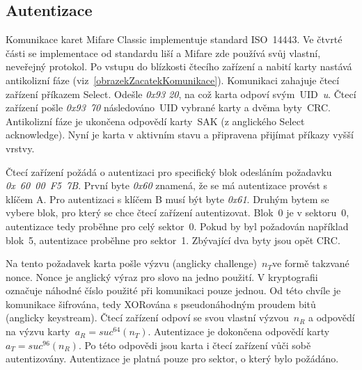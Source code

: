 \subsection{Autentizace}
\label{autentizace}
Komunikace karet Mifare Classic implementuje standard ISO~14443. Ve čtvrté části se implementace od standardu liší a Mifare zde používá svůj vlastní, neveřejný protokol. Po vstupu do blízkosti čtecího zařízení a nabití karty nastává antikolizní fáze (viz~\ref{obrazekZacatekKomunikace}). Komunikaci zahajuje čtecí zařízení příkazem Select. Odešle \emph{0x93 20}, na což karta odpoví svým~UID~\emph{u}. Čtecí zařízení pošle \emph{0x93~70} následováno~UID vybrané karty a dvěma byty~CRC. Antikolizní fáze je ukončena odpovědí karty~SAK (z anglického Select acknowledge). Nyní je karta v aktivním stavu a připravena přijímat příkazy vyšší vrstvy\cite{PracticalAttackOnMifare}.
\par
Čtecí zařízení požádá o autentizaci pro specifický blok odesláním požadavku \emph{0x~60~00~F5~7B}. První byte \emph{0x60} znamená, že se má autentizace provést s klíčem A. Pro autentizaci s klíčem B musí být byte \emph{0x61}. Druhým bytem se vybere blok, pro který se chce čtecí zařízení autentizovat. Blok~0 je v sektoru~0, autentizace tedy proběhne pro celý sektor~0. Pokud by byl požadován například blok~5, autentizace proběhne pro sektor~1. Zbývající dva byty jsou opět CRC\cite{PracticalAttackOnMifare}. 
\par
Na tento požadavek karta pošle výzvu (anglicky challenge)~${n_T}$\footnotemark ve formě takzvané nonce\cite{Wirelessly_Pickpocketing}. Nonce je anglický výraz pro slovo na jedno použití. V kryptografii označuje náhodné číslo použité při komunikaci pouze jednou\cite{Nonce_Based_Encryption}. Od této chvíle je komunikace šifrována, tedy XORována s pseudonáhodným proudem bitů (anglicky keystream). Čtecí zařízení odpoví se svou vlastní výzvou~${n_R}$ a odpovědí na výzvu karty~${a_R = suc^{64}(n_T)}$. Autentizace je dokončena odpovědí karty~${a_T = suc^{96}(n_R)}$. Po této odpovědi jsou karta i čtecí zařízení vůči sobě autentizovány. Autentizace je platná pouze pro sektor, o který bylo požádáno\cite{Wirelessly_Pickpocketing}. 


